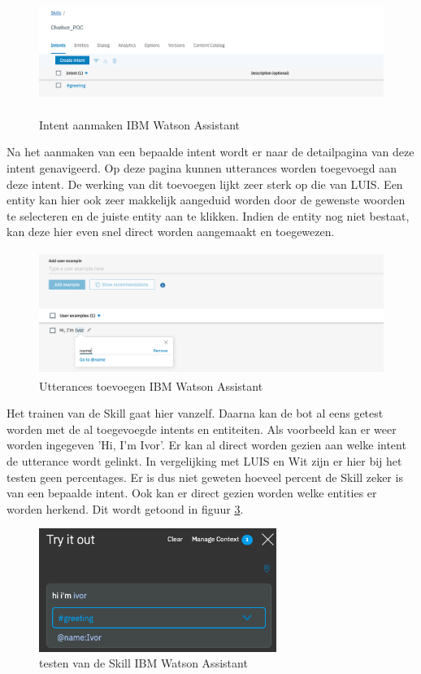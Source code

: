 \begin{figure}[h!]
	\centering
	\includegraphics[height=4cm]{img/ibm_intents.png}
	\caption{Intent aanmaken IBM Watson Assistant}
	\label{fig:intentsIbm}
\end{figure}

Na het aanmaken van een bepaalde intent wordt er naar de detailpagina van deze intent genavigeerd. Op deze pagina kunnen utterances worden toegevoegd aan deze intent. De werking van dit toevoegen lijkt zeer sterk op die van LUIS. Een entity kan hier ook zeer makkelijk aangeduid worden door de gewenste woorden te selecteren en de juiste entity aan te klikken. Indien de entity nog niet bestaat, kan deze hier even snel direct worden aangemaakt en toegewezen.

\begin{figure}[h!]
	\centering
	\includegraphics[height=4cm]{img/imb_utterances.png}
	\caption{Utterances toevoegen IBM Watson Assistant}
	\label{fig:utterancesIbm}
\end{figure}

Het trainen van de Skill gaat hier vanzelf. Daarna kan de bot al eens getest worden met de al toegevoegde intents en entiteiten. Als voorbeeld kan er weer worden ingegeven 'Hi, I'm Ivor'. Er kan al direct worden gezien aan welke intent de utterance wordt gelinkt. In vergelijking met LUIS en Wit zijn er hier bij het testen geen percentages. Er is dus niet geweten hoeveel percent de Skill zeker is van een bepaalde intent. Ook kan er direct gezien worden welke entities er worden herkend. Dit wordt getoond in figuur \ref{fig:tryIbm}.

\begin{figure}[h!]
	\centering
	\includegraphics[height=4cm]{img/ibm_try.png}
	\caption{testen van de Skill IBM Watson Assistant}
	\label{fig:tryIbm}
\end{figure}

